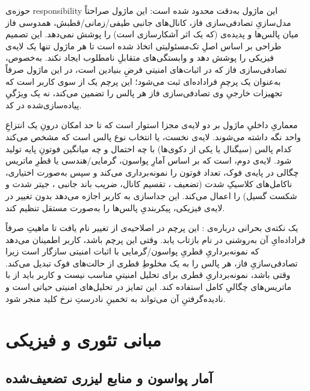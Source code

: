 حوزه‌ی responsibility این ماژول به‌دقت محدود شده است: این ماژول صراحتاً مدل‌سازیِ تصادفی‌سازی فاز، کانال‌های جانبی طیفی/زمانی/قطبش، همدوسی فاز میان پالس‌ها و پدیده‌ی  (که یک اثر آشکارسازی است) را پوشش نمی‌دهد. این تصمیم طراحی بر اساس اصلِ تک‌مسئولیتی  اتخاذ شده است تا هر ماژول تنها یک لایه‌ی فیزیکی را پوشش دهد و وابستگی‌های متقابلِ نامطلوب ایجاد نکند. به‌خصوص، تصادفی‌سازی فاز که در اثبات‌های امنیتی  فرضِ بنیادین است، در این ماژول صرفاً به‌عنوان یک پرچمِ فراداده‌ای  ثبت می‌شود؛ این پرچم یک  از سوی کاربر است که تجهیزات خارجیِ وی تصادفی‌سازی فاز هر پالس را تضمین می‌کند، نه یک ویژگیِ پیاده‌سازی‌شده در کد.

معماریِ داخلیِ ماژول بر دو لایه‌ی مجزا استوار است که تا حد امکان درونِ یک انتزاعِ واحد نگه داشته می‌شوند. لایه‌ی نخست،  یا انتخاب نوع پالس است که مشخص می‌کند کدام پالس (سیگنال یا یکی از دکوی‌ها) با چه احتمال و چه میانگین فوتونِ پایه تولید شود. لایه‌ی دوم،  است که بر اساس آمارِ پواسون، گرمایی/هندسی یا قطرِ ماتریس چگالی در پایه‌ی فوک، تعداد فوتون را نمونه‌برداری می‌کند و سپس به‌صورت اختیاری، ناکامل‌های کلاسیکِ شدت (تضعیف ، تقسیم کانال، ضریب باند جانبی ، جیتر شدت و شکست گسیل) را اعمال می‌کند. این جداسازی به کاربر اجازه می‌دهد بدون تغییر در لایه‌ی فیزیکی، پیکربندیِ پالس‌ها را به‌صورت مستقل تنظیم کند.

یک نکته‌ی بحرانی درباره‌ی : این پرچم در اصلاحیه‌ی  از  تغییر نام یافت تا ماهیتِ صرفاً فراداده‌ایِ آن به‌روشنی در نام بازتاب یابد. وقتی این پرچم  باشد، کاربر اطمینان می‌دهد که نمونه‌برداریِ قطریِ پواسون/گرمایی با اثبات امنیتی سازگار است زیرا تصادفی‌سازیِ فاز، هر پالس را به یک مخلوطِ قطری از حالت‌های فوک تبدیل می‌کند. وقتی  باشد، نمونه‌برداریِ قطری برای تحلیل امنیتیِ  مناسب نیست و کاربر باید از  با ماتریس‌های چگالیِ کامل استفاده کند. این تمایز در تحلیل‌های امنیتی حیاتی است و نادیده‌گرفتنِ آن می‌تواند به تخمینِ نادرستِ نرخ کلید منجر شود.

\section{مبانی تئوری و فیزیکی}
\label{sec:sources-theory}

\subsection{آمار پواسون و منابع لیزری تضعیف‌شده}

